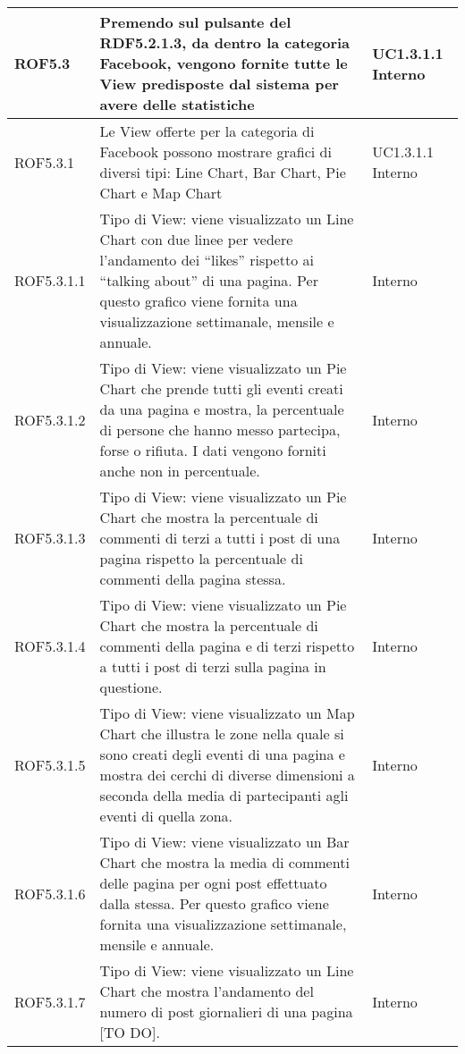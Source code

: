 \begin{center}
\begin{longtable}{| p{2cm} | p{8cm} | p{2cm} |}
		ROF5.3  & Premendo sul pulsante del RDF5.2.1.3, da dentro la categoria Facebook, vengono fornite tutte le View predisposte dal sistema per avere delle statistiche & UC1.3.1.1 \newline Interno \\
		\hline
		ROF5.3.1  & Le View offerte per la categoria di Facebook possono mostrare grafici di diversi tipi: Line Chart, Bar Chart, Pie Chart e Map Chart &  UC1.3.1.1 \newline Interno \\
		\hline
		ROF5.3.1.1  & Tipo di View: viene visualizzato un Line Chart con due linee per vedere l'andamento dei ``likes'' rispetto ai ``talking about'' di una pagina. Per questo grafico viene fornita una visualizzazione settimanale, mensile e annuale.  & Interno \\
		\hline
		ROF5.3.1.2  &  Tipo di View: viene visualizzato un Pie Chart che prende tutti gli eventi creati da una pagina e mostra, la percentuale di persone che hanno messo partecipa, forse o rifiuta. I dati vengono forniti anche non in percentuale. & Interno \\
		\hline
		ROF5.3.1.3  &  Tipo di View: viene visualizzato un Pie Chart che mostra la percentuale di commenti di terzi a tutti i post di una pagina rispetto la percentuale di commenti della pagina stessa. & Interno \\
		\hline
		ROF5.3.1.4  &  Tipo di View: viene visualizzato un Pie Chart che mostra la percentuale di commenti della pagina e di terzi rispetto a tutti i post di terzi sulla pagina in questione. & Interno \\
		\hline
		ROF5.3.1.5  &  Tipo di View: viene visualizzato un Map Chart che illustra le zone nella quale si sono creati degli eventi di una pagina e mostra dei cerchi di diverse dimensioni a seconda della media di partecipanti agli eventi di quella zona. & Interno \\
		\hline
		ROF5.3.1.6  &  Tipo di View: viene visualizzato un Bar Chart che mostra la media di commenti delle pagina per ogni post effettuato dalla stessa. Per questo grafico viene fornita una visualizzazione settimanale, mensile e annuale. & Interno \\
		\hline
		ROF5.3.1.7  &  Tipo di View: viene visualizzato un Line Chart che mostra l’andamento del numero di post giornalieri di una pagina [TO DO]. & Interno \\
		\hline



\end{longtable}
\end{center}
